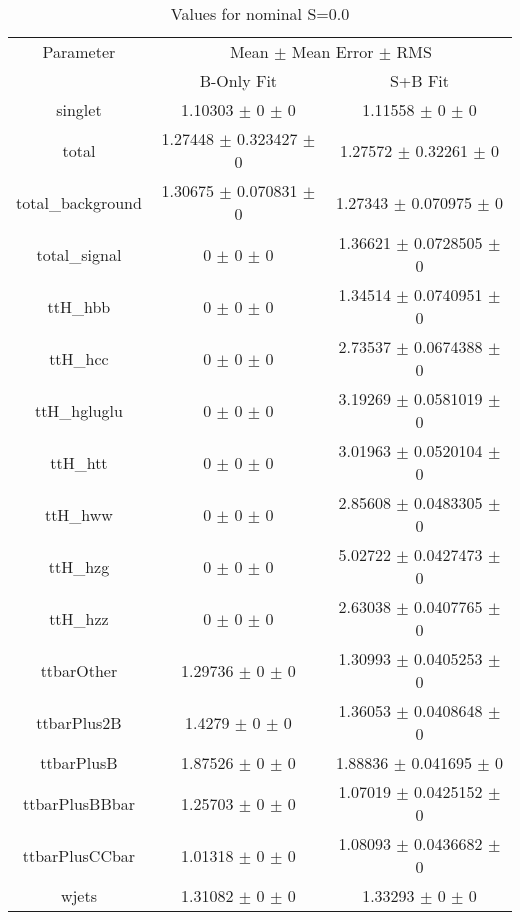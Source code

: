 \begin{table}
\centering
\caption{Values for nominal S=0.0}
\begin{tabular}{ccc}
\toprule
Parameter & \multicolumn{2}{c}{Mean $\pm$ Mean Error $\pm$ RMS}\\
 & B-Only Fit & S+B Fit\\
\midrule
singlet & \num{1.10303} $\pm$ \num{0} $\pm$ \num{0} & \num{1.11558} $\pm$ \num{0} $\pm$ \num{0}\\
total & \num{1.27448} $\pm$ \num{0.323427} $\pm$ \num{0} & \num{1.27572} $\pm$ \num{0.32261} $\pm$ \num{0}\\
total\_background & \num{1.30675} $\pm$ \num{0.070831} $\pm$ \num{0} & \num{1.27343} $\pm$ \num{0.070975} $\pm$ \num{0}\\
total\_signal & \num{0} $\pm$ \num{0} $\pm$ \num{0} & \num{1.36621} $\pm$ \num{0.0728505} $\pm$ \num{0}\\
ttH\_hbb & \num{0} $\pm$ \num{0} $\pm$ \num{0} & \num{1.34514} $\pm$ \num{0.0740951} $\pm$ \num{0}\\
ttH\_hcc & \num{0} $\pm$ \num{0} $\pm$ \num{0} & \num{2.73537} $\pm$ \num{0.0674388} $\pm$ \num{0}\\
ttH\_hgluglu & \num{0} $\pm$ \num{0} $\pm$ \num{0} & \num{3.19269} $\pm$ \num{0.0581019} $\pm$ \num{0}\\
ttH\_htt & \num{0} $\pm$ \num{0} $\pm$ \num{0} & \num{3.01963} $\pm$ \num{0.0520104} $\pm$ \num{0}\\
ttH\_hww & \num{0} $\pm$ \num{0} $\pm$ \num{0} & \num{2.85608} $\pm$ \num{0.0483305} $\pm$ \num{0}\\
ttH\_hzg & \num{0} $\pm$ \num{0} $\pm$ \num{0} & \num{5.02722} $\pm$ \num{0.0427473} $\pm$ \num{0}\\
ttH\_hzz & \num{0} $\pm$ \num{0} $\pm$ \num{0} & \num{2.63038} $\pm$ \num{0.0407765} $\pm$ \num{0}\\
ttbarOther & \num{1.29736} $\pm$ \num{0} $\pm$ \num{0} & \num{1.30993} $\pm$ \num{0.0405253} $\pm$ \num{0}\\
ttbarPlus2B & \num{1.4279} $\pm$ \num{0} $\pm$ \num{0} & \num{1.36053} $\pm$ \num{0.0408648} $\pm$ \num{0}\\
ttbarPlusB & \num{1.87526} $\pm$ \num{0} $\pm$ \num{0} & \num{1.88836} $\pm$ \num{0.041695} $\pm$ \num{0}\\
ttbarPlusBBbar & \num{1.25703} $\pm$ \num{0} $\pm$ \num{0} & \num{1.07019} $\pm$ \num{0.0425152} $\pm$ \num{0}\\
ttbarPlusCCbar & \num{1.01318} $\pm$ \num{0} $\pm$ \num{0} & \num{1.08093} $\pm$ \num{0.0436682} $\pm$ \num{0}\\
wjets & \num{1.31082} $\pm$ \num{0} $\pm$ \num{0} & \num{1.33293} $\pm$ \num{0} $\pm$ \num{0}\\
\bottomrule
\end{tabular}
\end{table}
